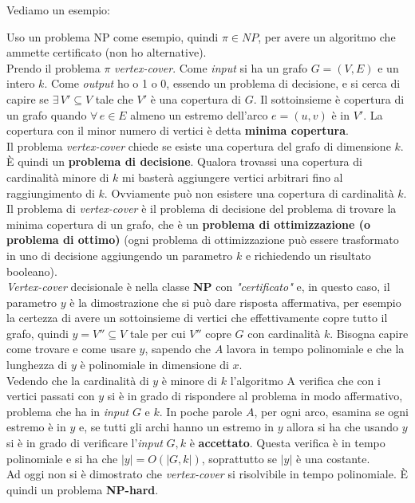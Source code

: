 Vediamo un esempio:
\begin{esempio}
  Uso un problema NP come esempio, quindi $\pi\in NP$, per avere un algoritmo
  che ammette certificato (non ho alternative). \\
  Prendo il problema $\pi$ \emph{vertex-cover}. Come \textit{input} si ha un grafo
  $G=(V,E)$ e un intero $k$. Come \textit{output} ho o 1 o 0, essendo un problema di
  decisione, e si cerca di capire se $\exists\, V'\subseteq V$ tale che $V'$ è
  una copertura di $G$. Il sottoinsieme è copertura di un grafo quando
  $\forall\, e\in E$ almeno un estremo dell'arco $e=(u,v)$ è in $V'$. La
  copertura con il minor numero di vertici è detta \textbf{minima copertura}.\\
  Il problema \emph{vertex-cover} chiede se esiste una copertura del grafo di
  dimensione $k$. È quindi un \textbf{problema di decisione}. Qualora trovassi
  una copertura di cardinalità minore di $k$ mi basterà aggiungere vertici
  arbitrari fino al raggiungimento di $k$. Ovviamente può non esistere una
  copertura di cardinalità $k$.\\
  Il problema di \emph{vertex-cover} è il problema di decisione del problema di
  trovare la minima copertura di un grafo, che è un \textbf{problema di
    ottimizzazione (o problema di ottimo)} (ogni problema di ottimizzazione può
  essere trasformato in uno di decisione aggiungendo un parametro $k$ e
  richiedendo un risultato booleano).\\
  \emph{Vertex-cover} decisionale è nella classe \textbf{NP} con \textit{"certificato"}
  e, in questo caso, il parametro $y$ è la dimostrazione che si può dare risposta
  affermativa, per esempio la certezza di avere un sottoinsieme di vertici che
  effettivamente copre tutto il grafo, quindi $y=V''\subseteq V$ tale per cui
  $V''$ copre $G$ con cardinalità $k$. Bisogna capire come trovare e come usare
  $y$, sapendo che $A$ lavora in tempo polinomiale e che la lunghezza di $y$ è
  polinomiale in dimensione di $x$.\\ 
  Vedendo che la cardinalità di $y$ è minore di $k$ l'algoritmo A verifica che
  con i vertici passati con $y$ si è in grado di rispondere al problema in modo
  affermativo, problema che ha in \textit{input} $G$ e $k$. In poche parole $A$, per ogni
  arco, esamina se ogni estremo è in $y$ e, se tutti gli archi hanno un estremo
  in $y$ allora si ha che usando $y$ si è in grado di verificare l'\textit{input} $G,
  k$ è \textbf{accettato}. Questa verifica è in tempo polinomiale e si ha che
  $|y|=O(|G,k|)$, soprattutto se $|y|$ è una costante.\\
  Ad oggi non si è dimostrato che \emph{vertex-cover} si risolvibile in tempo
  polinomiale. È quindi un problema \textbf{NP-hard}.
\end{esempio}

